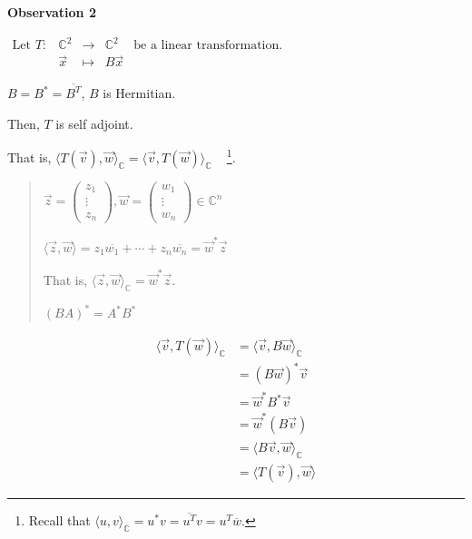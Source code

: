 \documentclass[11pt,fleqn]{book} %
\begin{document}
\textbf{Observation 2}

$\begin{matrix} \text{Let }T: &\mathbb{C}^2 &\to &\mathbb{C}^2 &\text{be a linear transformation}. \\ &\vec{x} &\mapsto &B\vec{x} \end{matrix}$

$B = B^* = \overline{B^T}$, $B$ is Hermitian.

Then, $T$ is self adjoint.

That is, $\langle T(\vec{v}), \vec{w} \rangle_{\mathbb{C}} = \langle \vec{v}, T(\vec{w}) \rangle_{\mathbb{C}}$ ~ \footnote{Recall that $\langle u, v \rangle_{\mathbb{C}} = u^*v = \overline{u^T} v = u^T\overline{w}$. }.

\begin{quote}
    $\vec{z} = \begin{pmatrix} z_1 \\ \vdots \\ z_n \end{pmatrix}, \vec{w} = \begin{pmatrix} w_1 \\ \vdots \\ w_n \end{pmatrix} \in \mathbb{C}^n$

    $\langle \vec{z}, \vec{w} \rangle = z_1 \overline{w_1} + \cdots + z_n\overline{w_n} = \vec{w}^* \vec{z}$

    That is, $\langle \vec{z}, \vec{w} \rangle_\mathbb{C} = \vec{w}^* \vec{z}$.

    $(BA)^* = A^*B^*$
\end{quote}
\begin{align*}
    \langle \vec{v}, T(\vec{w}) \rangle_\mathbb{C}
    &= \langle \vec{v}, B\vec{w} \rangle_\mathbb{C}
    \\
    &= (B\vec{w})^*\vec{v}
    \\
    &= \vec{w}^*B^*\vec{v}
    \\
    &= \vec{w}^* (B\vec{v})
    \\
    &= \langle B\vec{v}, \vec{w} \rangle_\mathbb{C}
    \\
    &= \langle T(\vec{v}), \vec{w} \rangle
\end{align*}
\end{document}
